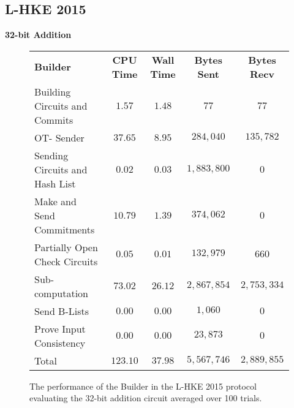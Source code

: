 \documentclass[ %
                    author={Nicholas Tutte},
                supervisor={Prof. Nigel Smart},
                    degree={MEng},
                     title={Secure Two Party Computation},
                  subtitle={A practical comparison of recent protocols},
                      type={Research - GG1K},
                      year={2015} ]{dissertation}
\begin{document}
			\subsection{L-HKE 2015}
				\FloatBarrier
				\noindent \textbf{32-bit Addition}
				\begin{figure}[!ht]
					\begin{tabular}{| p{4.3cm} | c c c c |}
						\hline
						\textbf{Builder} & \textbf{CPU Time} & \textbf{Wall Time} & \textbf{Bytes Sent} & \textbf{Bytes Recv} \\
						\thickhline
						Building Circuits and Commits & $1.57$ & $1.48$ & $77$ & $77$ \\
						\hline
						OT- Sender & $37.65$ & $8.95$ & $284,040$ & $135,782$ \\
						\hline
						Sending Circuits and Hash List & $0.02$ & $0.03$ & $1,883,800$ & $0$ \\
						\hline
						Make and Send Commitments & $10.79$ & $1.39$ & $374,062$ & $0$ \\
						\hline
						Partially Open Check Circuits & $0.05$ & $0.01$ & $132,979$ & $660$ \\
						\hline
						Sub-computation & $73.02$ & $26.12$ & $2,867,854$ & $2,753,334$ \\
						\hline
						Send B-Lists & $0.00$ & $0.00$ & $1,060$ & $0$ \\
						\hline
						Prove Input Consistency & $0.00$ & $0.00$ & $23,873$ & $0$ \\
						\thickhline
						Total & $123.10$ & $37.98$ & $5,567,746$ & $2,889,855$ \\
						\hline
					\end{tabular}
					\caption{The performance of the Builder in the L-HKE 2015 protocol evaluating the 32-bit addition circuit averaged over 100 trials. \label{table:L-HKE_2015_Add_Builder}}
				\end{figure}
\end{document}
